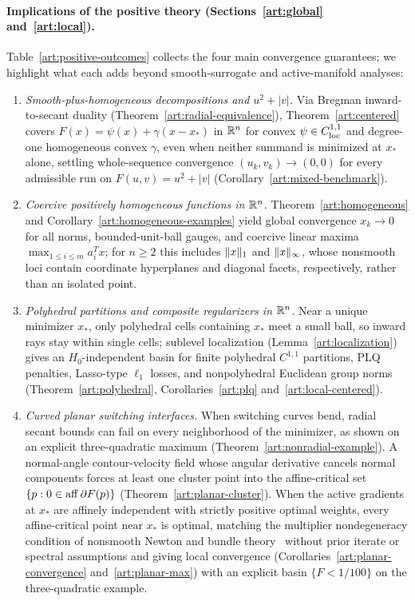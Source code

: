 \paragraph{Implications of the positive theory (Sections~\ref{art:global} and~\ref{art:local}).}
Table~\ref{art:positive-outcomes} collects the four main convergence guarantees;
we highlight what each adds beyond smooth-surrogate and active-manifold analyses:
\begin{enumerate}
\item \emph{Smooth-plus-homogeneous decompositions and $u^2+|v|$.}
Via Bregman inward-to-secant duality (Theorem~\ref{art:radial-equivalence}),
Theorem~\ref{art:centered} covers $F(x)=\psi(x)+\gamma(x-x_*)$ in $\mathbb R^n$ for
convex $\psi\in C^{1,1}_{\rm loc}$ and degree-one homogeneous convex $\gamma$,
even when neither summand is minimized at $x_*$ alone, settling whole-sequence
convergence $(u_k,v_k)\to(0,0)$ for every admissible run on $F(u,v)=u^2+|v|$
(Corollary~\ref{art:mixed-benchmark}).
\item \emph{Coercive positively homogeneous functions in $\mathbb R^n$.}
Theorem~\ref{art:homogeneous} and Corollary~\ref{art:homogeneous-examples} yield
global convergence $x_k\to0$ for all norms, bounded-unit-ball gauges, and
coercive linear maxima $\max_{1\le i\le m}a_i^Tx$; for $n\ge2$ this includes
$\lVert x\rVert_1$ and $\lVert x\rVert_\infty$, whose nonsmooth loci contain coordinate
hyperplanes and diagonal facets, respectively, rather than an isolated point.
\item \emph{Polyhedral partitions and composite regularizers in $\mathbb R^n$.}
Near a unique minimizer $x_*$, only polyhedral cells containing $x_*$ meet a
small ball, so inward rays stay within single cells; sublevel localization
(Lemma~\ref{art:localization}) gives an $H_0$-independent basin for finite
polyhedral $C^{1,1}$ partitions, PLQ penalties, Lasso-type $\ell_1$ losses, and
nonpolyhedral Euclidean group norms (Theorem~\ref{art:polyhedral},
Corollaries~\ref{art:plq} and~\ref{art:local-centered}).
\item \emph{Curved planar switching interfaces.}
When switching curves bend, radial secant bounds can fail on every neighborhood
of the minimizer, as shown on an explicit three-quadratic maximum
(Theorem~\ref{art:nonradial-example}). A normal-angle contour-velocity field whose angular derivative cancels normal
components forces at least one cluster point into the affine-critical set
$\{p:0\in\operatorname{aff}\partial F(p)\}$ (Theorem~\ref{art:planar-cluster}). When the active gradients at $x_*$ are
affinely independent with strictly positive optimal weights, every
affine-critical point near $x_*$ is optimal, matching the multiplier
nondegeneracy condition of nonsmooth Newton and bundle theory~
without prior iterate or spectral assumptions and giving local convergence
(Corollaries~\ref{art:planar-convergence} and~\ref{art:planar-max}) with an
explicit basin $\{F<1/100\}$ on the three-quadratic example.
\end{enumerate}


